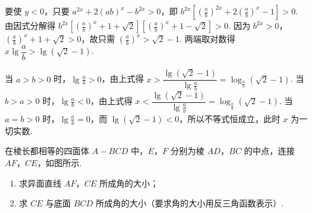 \documentclass[UTF8,a4paper,oneside,11pt]{ctexbook}
\begin{document}
\begin{solution}
要使 \(y<0\)，只要 \(a^{2x}+2(ab)^x-b^{2x}>0\)，即 \(b^{2x}\left[ \left( \frac{a}{b} \right)^{2x}+2\left( \frac{a}{b} \right)^x-1 \right]>0\). 由因式分解得 \(b^{2x}\left[ \left( \frac{a}{b} \right)^x+1+\sqrt{2} \right]\left[ \left( \frac{a}{b} \right)^x+1-\sqrt{2} \right]>0\). 因为 \(b^{2x}>0\)，\(\left( \frac{a}{b} \right)^x+1+\sqrt{2}>0\)，故只需 \(\left( \frac{a}{b} \right)^x>\sqrt{2}-1\). 两端取对数得 \(x\lg\dfrac{a}{b}>\lg(\sqrt{2}-1)\).

当 \(a>b>0\) 时，\(\lg\frac{a}{b}>0\)，由上式得 \(x>\dfrac{\lg(\sqrt{2}-1)}{\lg\frac{a}{b}}=\log_{\frac{a}{b}}(\sqrt{2}-1)\). 当 \(b>a>0\) 时，\(\lg\frac{a}{b}<0\)，由上式得 \(x<\dfrac{\lg(\sqrt{2}-1)}{\lg\frac{a}{b}}=\log_{\frac{a}{b}}(\sqrt{2}-1)\). 当 \(a=b>0\) 时，\(\lg\frac{a}{b}=0\)，而 \(\lg(\sqrt{2}-1)<0\)，所以不等式恒成立，此时 \(x\) 为一切实数.
\end{solution}

\begin{problem}
在棱长都相等的四面体 \(A-BCD\) 中，\(E\)，\(F\) 分别为棱 \(AD\)，\(BC\) 的中点，连接 \(AF\)，\(CE\)，如图所示.

\begin{enumerate}
\item 求异面直线 \(AF\)，\(CE\) 所成角的大小；
\item 求 \(CE\) 与底面 \(BCD\) 所成角的大小（要求角的大小用反三角函数表示）.
\end{enumerate}

\end{problem}
\end{document}
